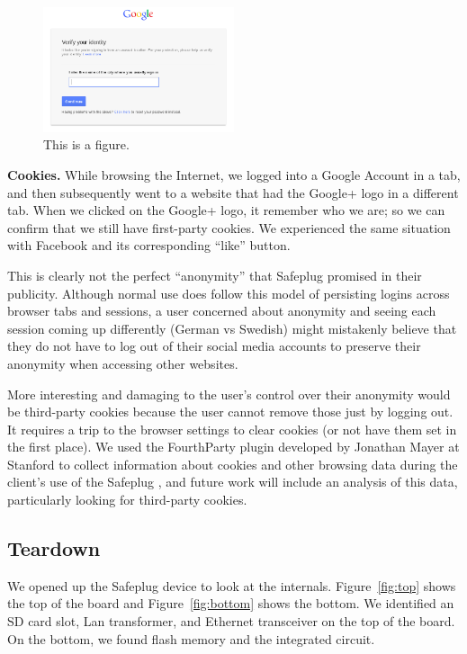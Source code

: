 \begin{figure}[htb]
\begin{center}
\includegraphics[width=0.5\textwidth]{funnygoogle}
\caption{This is a figure.}
\label{fig:funnygoogle}
\end{center}
\end{figure}

{\bf Cookies.}  While browsing the Internet, we logged into a Google Account in a tab, and then subsequently went to a website that had the Google+ logo in a different tab.  When we clicked on the Google+ logo, it remember who we are; so we can confirm that we still have first-party cookies.  We experienced the same situation with Facebook and its corresponding ``like'' button.

This is clearly not the perfect ``anonymity'' that Safeplug promised in their publicity.  Although normal use does follow this model of persisting logins across browser tabs and sessions, a user concerned about anonymity and seeing each session coming up differently (German vs Swedish) might mistakenly believe that they do not have to log out of their social media accounts to preserve their anonymity when accessing other websites.

More interesting and damaging to the user's control over their anonymity would be third-party cookies because the user cannot remove those just by logging out.  It requires a trip to the browser settings to clear cookies (or not have them set in the first place).  We used the FourthParty plugin developed by Jonathan Mayer at Stanford to collect information about cookies and other browsing data during the client's use of the Safeplug \cite{fourthparty}, and future work will include an analysis of this data, particularly looking for third-party cookies.

\subsection{Teardown}
\label{sec:tear}
We opened up the Safeplug device to look at the internals.  Figure~\ref{fig:top} shows the top of the board and Figure~\ref{fig:bottom} shows the bottom.  We identified an SD card slot, Lan transformer, and Ethernet transceiver on the top of the board.  On the bottom, we found flash memory and the integrated circuit.

